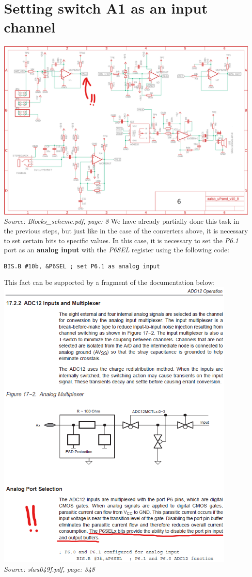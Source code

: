 \documentclass{article}
\begin{document}
\section{Setting switch A1 as an input channel}
\includegraphics[width=\textwidth]{"../img/Blocks_scheme_8.png"}
\textit{Source: Blocks\_scheme.pdf, page: 8}
We have already partially done this task in the previous steps, but just like in the case of the converters above, it is necessary to set certain bits to specific values.
In this case, it is necessary to set the \textit{P6.1} port as an \textbf{analog input} with the \textit{P6SEL} register using the following code:
\begin{verbatim}
BIS.B #10b, &P6SEL ; set P6.1 as analog input \end{verbatim}
This fact can be supported by a fragment of the documentation below: \\
\includegraphics[width=0.9\textwidth]{"../img/slau049f_348.png"} \\
\textit{Source: slau049f.pdf, page: 348}
\end{document}
